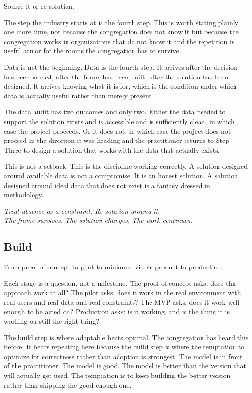 Source it or re-solution.

The step the industry starts at is the fourth step. This is worth stating plainly one more time, not because the congregation does not know it but because the congregation works in organizations that do not know it and the repetition is useful armor for the rooms the congregation has to survive.

Data is not the beginning. Data is the fourth step. It arrives after the decision has been named, after the frame has been built, after the solution has been designed. It arrives knowing what it is for, which is the condition under which data is actually useful rather than merely present.

The data audit has two outcomes and only two. Either the data needed to support the solution exists and is accessible and is sufficiently clean, in which case the project proceeds. Or it does not, in which case the project does not proceed in the direction it was heading and the practitioner returns to Step Three to design a solution that works with the data that actually exists.

This is not a setback. This is the discipline working correctly. A solution designed around available data is not a compromise. It is an honest solution. A solution designed around ideal data that does not exist is a fantasy dressed in methodology.

\begin{center}\small\itshape
  Treat absence as a constraint. Re-solution around it.\\
  The frame survives. The solution changes. The work continues.
\end{center}

\subsection*{Build}

From proof of concept to pilot to minimum viable product to production.

Each stage is a question, not a milestone. The proof of concept asks: does this approach work at all? The pilot asks: does it work in the real environment with real users and real data and real constraints? The MVP asks: does it work well enough to be acted on? Production asks: is it working, and is the thing it is working on still the right thing?

The build step is where adoptable beats optimal. The congregation has heard this before. It bears repeating here because the build step is where the temptation to optimize for correctness rather than adoption is strongest. The model is in front of the practitioner. The model is good. The model is better than the version that will actually get used. The temptation is to keep building the better version rather than shipping the good enough one.

